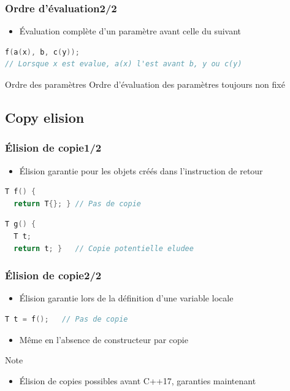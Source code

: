 \documentclass[C++.tex]{subfiles}
\begin{document}
\begin{frame}[fragile]
	\frametitle{Ordre d'évaluation\titlehfill{}2/2}
	\begin{itemize}
		\item Évaluation complète d'un paramètre avant celle du suivant
	\end{itemize}
	
	\begin{lstlisting}[language=C++]
f(a(x), b, c(y));
// Lorsque x est evalue, a(x) l'est avant b, y ou c(y)\end{lstlisting}
	
	\begin{alertblock}{Ordre des paramètres}
		Ordre d'évaluation des paramètres toujours non fixé
	\end{alertblock}
\end{frame}

\subsection*{Copy elision}
\begin{frame}[fragile]
	\frametitle{Élision de copie\titlehfill{}1/2}
	\begin{itemize}
		\item Élision garantie pour les objets créés dans l'instruction de retour
	\end{itemize}

	\begin{lstlisting}[language=C++]
T f() {
  return T{}; } // Pas de copie\end{lstlisting}

	\begin{lstlisting}[language=C++]
T g() {
  T t;
  return t; }   // Copie potentielle eludee\end{lstlisting}
\end{frame}

\begin{frame}[fragile]
	\frametitle{Élision de copie\titlehfill{}2/2}
	\begin{itemize}
		\item Élision garantie lors de la définition d'une variable locale
	\end{itemize}

	\begin{lstlisting}[language=C++]
T t = f();   // Pas de copie\end{lstlisting}

	\begin{itemize}
		\item Même en l'absence de constructeur par copie
	\end{itemize}

	\begin{block}{Note}
		\begin{itemize}
			\item Élision de copies possibles avant C++17, garanties maintenant
		\end{itemize}
	\end{block}
\end{frame}
\end{document}
